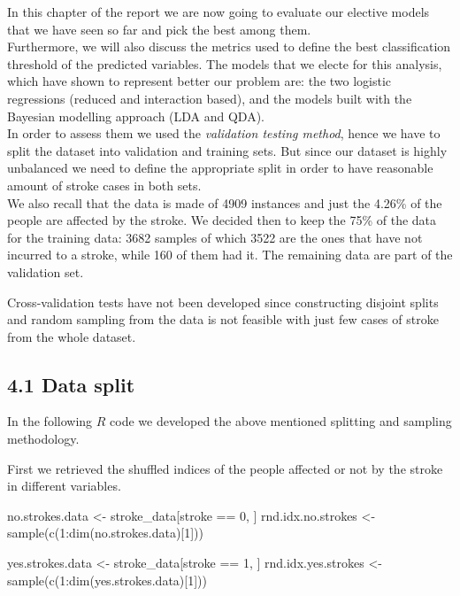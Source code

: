 \documentclass[
]{article}
\newenvironment{Shaded}{\begin{snugshade}}{\end{snugshade}}
\newcommand{\DecValTok}[1]{\textcolor[rgb]{0.00,0.00,0.81}{#1}}
\newcommand{\FunctionTok}[1]{\textcolor[rgb]{0.00,0.00,0.00}{#1}}
\newcommand{\NormalTok}[1]{#1}
\newcommand{\OtherTok}[1]{\textcolor[rgb]{0.56,0.35,0.01}{#1}}
\newcommand{\SpecialCharTok}[1]{\textcolor[rgb]{0.00,0.00,0.00}{#1}}
\begin{document}
In this chapter of the report we are now going to evaluate our elective
models that we have seen so far and pick the best among them.\\
Furthermore, we will also discuss the metrics used to define the best
classification threshold of the predicted variables. The models that we
electe for this analysis, which have shown to represent better our
problem are: the two logistic regressions (reduced and interaction
based), and the models built with the Bayesian modelling approach (LDA
and QDA).\\
In order to assess them we used the \emph{validation testing method},
hence we have to split the dataset into validation and training sets. But since
our dataset is highly unbalanced we need to define the appropriate split
in order to have reasonable amount of stroke cases in both sets.\\
We also recall that the data is made of 4909 instances and just the
4.26\% of the people are affected by the stroke. We decided then to keep
the 75\% of the data for the training data: 3682 samples of which 3522
are the ones that have not incurred to a stroke, while 160 of them had
it. The remaining data are part of the validation set.

Cross-validation tests have not been developed since constructing
disjoint splits and random sampling from the data is not feasible with
just few cases of stroke from the whole dataset.

\hypertarget{data-split}{%
\subsection{4.1 Data split}\label{data-split}}

In the following \(R\) code we developed the above mentioned splitting
and sampling methodology.

First we retrieved the shuffled indices of the people affected or not by
the stroke in different variables.

\begin{Shaded}
\begin{Highlighting}[]
\NormalTok{no.strokes.data }\OtherTok{\textless{}{-}}\NormalTok{ stroke\_data[stroke }\SpecialCharTok{==} \DecValTok{0}\NormalTok{, ]}
\NormalTok{rnd.idx.no.strokes }\OtherTok{\textless{}{-}} \FunctionTok{sample}\NormalTok{(}\FunctionTok{c}\NormalTok{(}\DecValTok{1}\SpecialCharTok{:}\FunctionTok{dim}\NormalTok{(no.strokes.data)[}\DecValTok{1}\NormalTok{]))}

\NormalTok{yes.strokes.data }\OtherTok{\textless{}{-}}\NormalTok{ stroke\_data[stroke }\SpecialCharTok{==} \DecValTok{1}\NormalTok{, ]}
\NormalTok{rnd.idx.yes.strokes }\OtherTok{\textless{}{-}} \FunctionTok{sample}\NormalTok{(}\FunctionTok{c}\NormalTok{(}\DecValTok{1}\SpecialCharTok{:}\FunctionTok{dim}\NormalTok{(yes.strokes.data)[}\DecValTok{1}\NormalTok{]))}
\end{Highlighting}
\end{Shaded}
\end{document}
